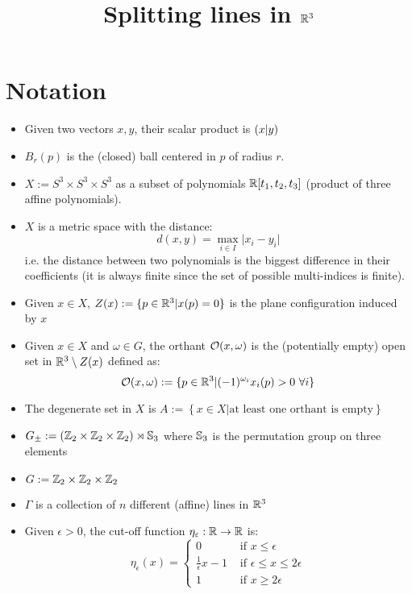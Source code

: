 \documentclass[9pt]{article}
\title{Splitting lines in $\mathbb{R}^3$}
\date{}
\author{}
\begin{document}
\maketitle

\section*{Notation}
\begin{itemize}

\item Given two vectors $x, y$, their scalar product is $\left( x \vert y\right)$

\item $B_r(p)$ is the (closed) ball centered in $p$ of radius $r$.
\item $X := S^3\times S^3 \times S^3$ as a subset of polynomials $\mathbb{R}[t_1, t_2, t_3]$ (product of three affine polynomials).
\item $X$ is a metric space with the distance:
  \[
    d(x,y) = \max_{i\in I}\vert x_i - y_i\vert
  \]
  i.e. the distance between two polynomials is the biggest difference in their coefficients (it is always finite since the set of possible multi-indices is finite).

    \item Given $x\in X$, $Z(x) := \{p\in \mathbb{R}^3 \vert x(p) = 0\}$ is the plane configuration induced by $x$
    \item Given $x\in X$ and $\omega \in G$, the orthant $\mathcal{O}(x, \omega)$ is the (potentially empty) open set in $\mathbb{R}^3 \setminus Z(x)$ defined as:
    \[
        \mathcal{O}(x, \omega) := \{p\in \mathbb{R}^3\vert (-1)^{\omega_i}x_i(p)>0\ \forall i\}
    \]

    \item The degenerate set in $X$ is
     $A :=\left\{x\in X \vert \mbox{at least one orthant is empty}\right\}$
    \item $G_\pm :=  \left(\mathbb{Z}_2\times \mathbb{Z}_2 \times \mathbb{Z}_2\right) \rtimes \mathbb{S}_3$ where $\mathbb{S}_3$ is the permutation group on three elements
    \item $G := \mathbb{Z}_2\times \mathbb{Z}_2 \times \mathbb{Z}_2$
    \item $\Gamma$ is a collection of $n$ different (affine) lines in $\mathbb{R}^3$
    \item Given $\epsilon>0$, the cut-off function $\eta_\varepsilon: \mathbb{R} \rightarrow \mathbb{R}$ is:
    \[
        \eta_\epsilon(x)= \begin{cases}
            0 & \mbox{ if }x\leq \epsilon\\
            \frac{1}{\epsilon}x -1 & \mbox{ if }\epsilon\leq x \leq 2\epsilon\\
            1 & \mbox{ if } x\geq 2\epsilon
        \end{cases}
      \]
\end{itemize}
\end{document}
